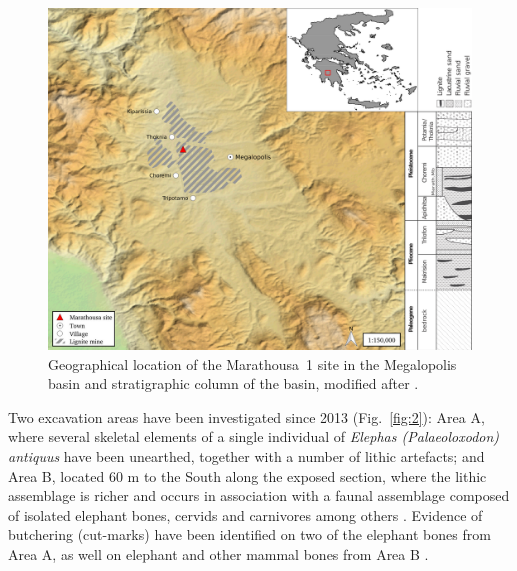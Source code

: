 \documentclass[preprint,authoryear,times]{elsarticle} %
\begin{document}
\begin{figure}[]
  \centering
  \includegraphics[width=1\textwidth]{../artwork/Fig1.png}
  \caption{Geographical location of the Marathousa~1 site in the Megalopolis basin and stratigraphic column of the basin, modified after \cite{Vugt2000}.}
  \label{fig:1}
\end{figure}

Two excavation areas have been investigated since 2013 (Fig.~\ref{fig:2}): Area A, where several skeletal elements of a single individual of \emph{Elephas (Palaeoloxodon) antiquus} have been unearthed, together with a number of lithic artefacts; and Area B, located 60 m to the South along the exposed section, where the lithic assemblage is richer and occurs in association with a faunal assemblage composed of isolated elephant bones, cervids and carnivores among others \citep{Konidaris,Tourloukis}. Evidence of butchering (cut-marks) have been identified on two of the elephant bones from Area A, as well on elephant and other mammal bones from Area B \citep{Konidaris}.
\end{document}
